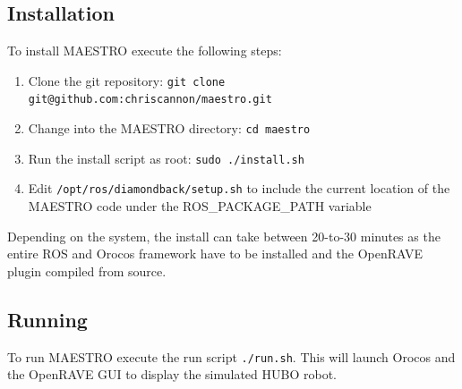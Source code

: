 \documentclass{article}
\begin{document}
\subsection{Installation}
To install MAESTRO execute the following steps:
\begin{enumerate}
    \item Clone the git repository: \texttt{git clone git@github.com:chriscannon/maestro.git}
    \item Change into the MAESTRO directory: \texttt{cd maestro}
    \item Run the install script as root: \texttt{sudo ./install.sh}
    \item Edit \texttt{/opt/ros/diamondback/setup.sh} to include the
        current location of the MAESTRO code under the
        ROS\_PACKAGE\_PATH variable
\end{enumerate}
Depending on the system, the install can take between 20-to-30 minutes
as the entire ROS and Orocos framework have to be installed and the
OpenRAVE plugin compiled from source.

\subsection{Running}
To run MAESTRO execute the run script \texttt{./run.sh}. This will
launch Orocos and the OpenRAVE GUI to display the simulated HUBO robot.
\end{document}
